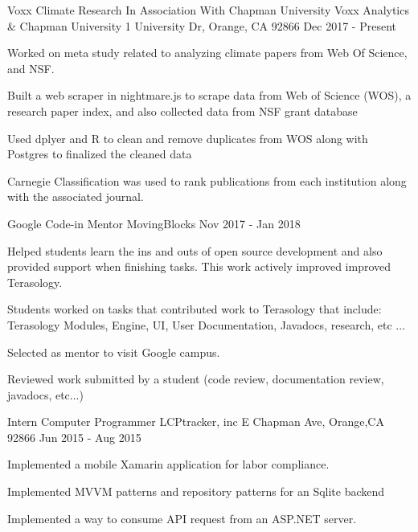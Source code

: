 \begin{cventries}
  \cventry
    {Voxx Climate Research In Association With Chapman University} %
    {Voxx Analytics \& Chapman University} %
    {1 University Dr, Orange, CA 92866} %
    { Dec 2017 - Present} %
    {
      \begin{cvitems} %
        \item {Worked on meta study related to analyzing climate papers from Web Of Science, and NSF.}
        \item {Built a web scraper in nightmare.js to scrape data from Web of Science (WOS), a research paper index, and also collected data from NSF grant database}
        \item {Used dplyer and R to clean and remove duplicates from WOS along with Postgres to finalized the cleaned data}
         \item {Carnegie Classification was used to rank publications from each institution along with the associated journal.}
      \end{cvitems}
    }
  \cventry
    {Google Code-in Mentor} %
    {MovingBlocks} %
    {} %
    { Nov 2017 - Jan 2018} %
    {
      \begin{cvitems} %
        \item {Helped students learn the ins and outs of open source development and also provided support when finishing tasks. This work actively improved improved Terasology. }
        \item {Students worked on tasks that contributed work to Terasology that include: Terasology Modules, Engine, UI, User Documentation, Javadocs, research, etc ...}
        \item {Selected as mentor to visit Google campus.}
        \item {Reviewed work submitted by a student (code review, documentation review, javadocs, etc...)}
      \end{cvitems}
    }
  \cventry
    {Intern Computer Programmer} %
    {LCPtracker, inc} %
    {E Chapman Ave, Orange,CA 92866} %
    {Jun 2015 - Aug 2015} %
    {
      \begin{cvitems} %
        \item{Implemented a mobile Xamarin application for labor compliance.}
        \item {Implemented MVVM patterns and repository patterns for an Sqlite backend}
        \item {Implemented a way to consume API request from an ASP.NET server.}
      \end{cvitems}
    }

\end{cventries}
